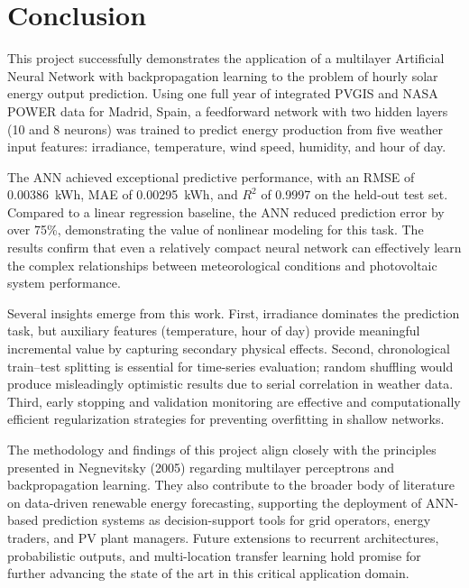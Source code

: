 \documentclass[11pt, a4paper]{article}
\begin{document}
\section{Conclusion}\label{sec:conclusion}

This project successfully demonstrates the application of a multilayer
Artificial Neural Network with backpropagation learning to the problem of
hourly solar energy output prediction. Using one full year of integrated PVGIS
and NASA POWER data for Madrid, Spain, a feedforward network with two hidden
layers (10 and 8 neurons) was trained to predict energy production from five
weather input features: irradiance, temperature, wind speed, humidity, and hour
of day.

The ANN achieved exceptional predictive performance, with an RMSE of
0.00386~kWh, MAE of 0.00295~kWh, and $R^2$ of 0.9997 on the held-out test set.
Compared to a linear regression baseline, the ANN reduced prediction error by
over 75\%, demonstrating the value of nonlinear modeling for this task. The
results confirm that even a relatively compact neural network can effectively
learn the complex relationships between meteorological conditions and
photovoltaic system performance.

Several insights emerge from this work. First, irradiance dominates the
prediction task, but auxiliary features (temperature, hour of day) provide
meaningful incremental value by capturing secondary physical effects. Second,
chronological train--test splitting is essential for time-series evaluation;
random shuffling would produce misleadingly optimistic results due to serial
correlation in weather data. Third, early stopping and validation monitoring
are effective and computationally efficient regularization strategies for
preventing overfitting in shallow networks.

The methodology and findings of this project align closely with the principles
presented in Negnevitsky (2005) regarding multilayer perceptrons and
backpropagation learning. They also contribute to the broader body of
literature on data-driven renewable energy forecasting, supporting the
deployment of ANN-based prediction systems as decision-support tools for grid
operators, energy traders, and PV plant managers. Future extensions to
recurrent architectures, probabilistic outputs, and multi-location transfer
learning hold promise for further advancing the state of the art in this
critical application domain.

\newpage
\end{document}

